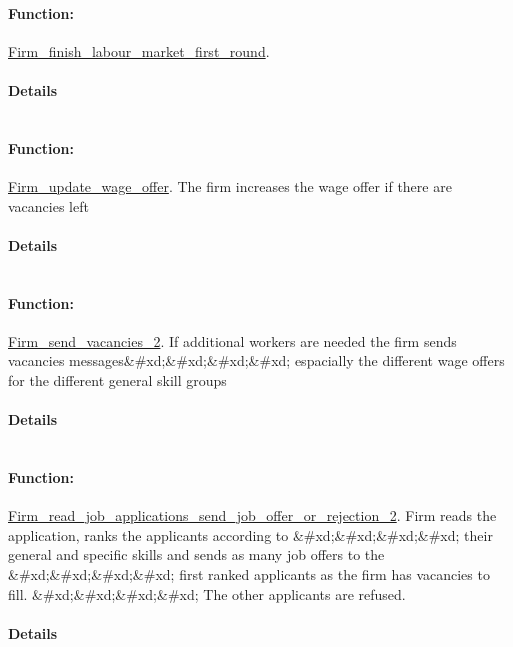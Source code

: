 \documentclass[a4paper,11pt]{article}
\begin{document}
\paragraph{Function:}\url{Firm_finish_labour_market_first_round}.

\paragraph{Details}
\begin{verbatim}
\end{verbatim}
\paragraph{Function:}\url{Firm_update_wage_offer}.
The firm increases the wage offer if there are vacancies left
\paragraph{Details}
\begin{verbatim}
\end{verbatim}
\paragraph{Function:}\url{Firm_send_vacancies_2}.
If additional workers are needed the firm sends vacancies messages\&\#xd;\&\#xd;\&\#xd;\&\#xd;
 espacially the different wage offers for the different general skill groups
\paragraph{Details}
\begin{verbatim}
\end{verbatim}
\paragraph{Function:}\url{Firm_read_job_applications_send_job_offer_or_rejection_2}.
Firm reads the application, ranks the applicants according to \&\#xd;\&\#xd;\&\#xd;\&\#xd;
their general and specific skills and sends as many job offers to the \&\#xd;\&\#xd;\&\#xd;\&\#xd;
first ranked applicants as the firm has vacancies to fill. \&\#xd;\&\#xd;\&\#xd;\&\#xd;
The other applicants are refused.
\paragraph{Details}
\begin{verbatim}
\end{verbatim}
\end{document}
